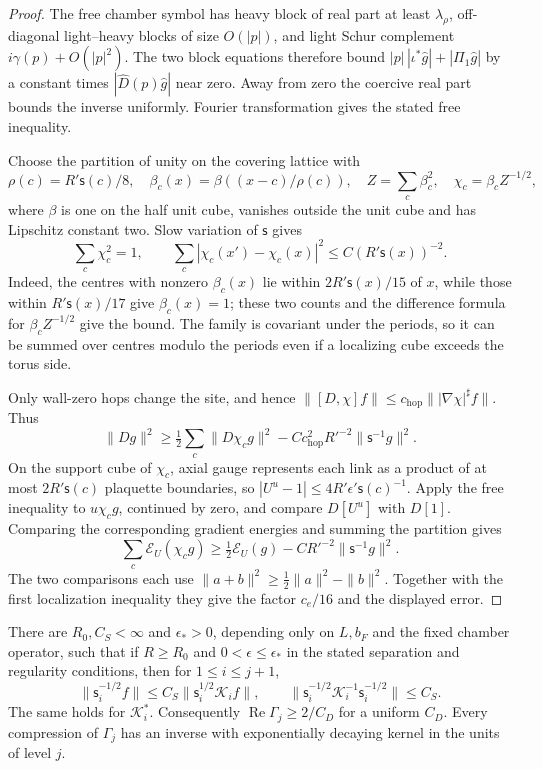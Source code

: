 \documentclass[11pt,letterpaper,reqno]{amsart}
\makeatletter
\theoremstyle{definition}
\newcommand{\ms@minorstart}{%
  \pushQED{\qed}\renewcommand{\qedsymbol}{$\blacksquare$}}
\newenvironment{proposition}[1][]{\ms@minorstart\ms@proposition[#1]}
  {\popQED\endms@proposition}
\theoremstyle{remark}
\makeatother
\begin{document}
\begin{proof}
The free chamber symbol has heavy block of real part at least
$\lambda_\rho$, off-diagonal light--heavy blocks of size
$O(|p|)$, and light Schur complement $i\gamma(p)+O(|p|^2)$.
The two block equations therefore bound
$|p|\,|\iota^*\hat g|+|\Pi_1\hat g|$ by a constant times
$|\hat D(p)\hat g|$ near zero.  Away from zero the coercive
real part bounds the inverse uniformly.  Fourier transformation
gives the stated free inequality.

Choose the partition of unity on the covering lattice with
\[
 \rho(c)=R'\mathsf s(c)/8,\quad
 \beta_c(x)=\beta((x-c)/\rho(c)),\quad
 Z=\sum_c\beta_c^2,\quad\chi_c=\beta_cZ^{-1/2},
\]
where $\beta$ is one on the half unit cube, vanishes outside the
unit cube and has Lipschitz constant two.  Slow variation of
$\mathsf s$ gives
\[
 \sum_c\chi_c^2=1,\qquad
 \sum_c|\chi_c(x')-\chi_c(x)|^2
                    \le C(R'\mathsf s(x))^{-2}.
\]
Indeed, the centres with nonzero $\beta_c(x)$ lie within
$2R'\mathsf s(x)/15$ of $x$, while those within
$R'\mathsf s(x)/17$ give $\beta_c(x)=1$; these two counts and
the difference formula for $\beta_cZ^{-1/2}$ give the bound.
The family is covariant under the periods, so it can be summed
over centres modulo the periods even if a localizing cube exceeds
the torus side.

Only wall-zero hops change the site, and hence
$\|[D,\chi]f\|\le c_{\mathrm{hop}}
\||\nabla\chi|^\sharp f\|$.
Thus
\[
 \|Dg\|^2\ge\tfrac12\sum_c\|D\chi_cg\|^2
                 -Cc_{\mathrm{hop}}^2R'^{-2}
                                  \|\mathsf s^{-1}g\|^2.
\]
On the support cube of $\chi_c$, axial gauge represents each link
as a product of at most $2R'\mathsf s(c)$ plaquette boundaries,
so $|U^u-1|\le4R'\epsilon'\mathsf s(c)^{-1}$.
Apply the free inequality to $u\chi_cg$, continued by zero, and
compare $D[U^u]$ with $D[1]$.  Comparing the corresponding gradient
energies and summing the partition gives
\[
 \sum_c\mathcal E_U(\chi_cg)
 \ge\tfrac12\mathcal E_U(g)-CR'^{-2}\|\mathsf s^{-1}g\|^2.
\]
The two comparisons each use
$\|a+b\|^2\ge\frac12\|a\|^2-\|b\|^2$.
Together with the first localization inequality they give the
factor $c_e/16$ and the displayed error.
\end{proof}

\begin{proposition}[Weighted energy and fluctuation accretivity]
\label{C-397-28}
There are $R_0,C_S<\infty$ and $\epsilon_*>0$, depending only on
$L,b_F$ and the fixed chamber operator, such that if $R\ge R_0$
and $0<\epsilon\le\epsilon_*$ in the stated separation and
regularity conditions, then for $1\le i\le j+1$,
\[
 \|\mathsf s_i^{-1/2}f\|\le
 C_S\|\mathsf s_i^{1/2}\mathcal K_if\|,
 \qquad
 \|\mathsf s_i^{-1/2}\mathcal K_i^{-1}
                         \mathsf s_i^{-1/2}\|\le C_S.
\]
The same holds for $\mathcal K_i^*$.  Consequently
$\operatorname{Re}\Gamma_j\ge2/C_D$ for a uniform $C_D$.
Every compression of $\Gamma_j$ has an inverse with exponentially
decaying kernel in the units of level $j$.
\end{proposition}
\end{document}
